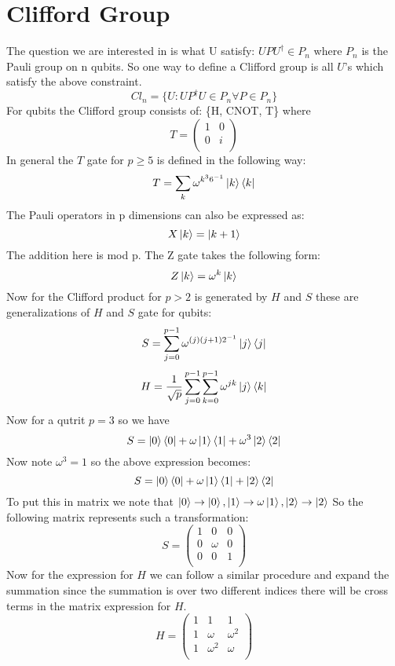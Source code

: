 \documentclass{article}
\begin{document}
\section{Clifford Group}
The question we are interested in is what U satisfy: $UPU^{\dagger} \in P_{n}$ where $P_{n}$ is the Pauli group on n qubits.
So one way to define a Clifford group is all $U$'s which satisfy the above constraint.
\begin{equation}
Cl_{n}=\{U: UP^{\dagger}U \in P_{n} \forall P \in P_{n}\}
\end{equation}
 For qubits the Clifford group consists of: \{H, CNOT, T\} where 
 \[
 T=
 \begin{pmatrix}
 1 & 0\\
 0 & i\\
 \end{pmatrix}
 \]
 In general the $T$ gate for $p \geq 5$ is defined in the following way:
 \[
 T=\sum_{k}\omega^{k^{3}6^{-1}}\ket{k}\bra{k}
 \]
The Pauli operators in p dimensions can also be expressed as:
\[
X\ket{k}=\ket{k+1}
\]
The addition here is mod p.
The Z gate takes the following form:
\[
Z\ket{k}=\omega^{k}\ket{k}
\]
Now for the Clifford product for $p>2$ is generated by $H$ and $S$ these are generalizations of $H$ and $S$ gate for qubits:
\[
S=\sum_{j=0}^{p-1}\omega^{(j)(j+1){2^{-1}}}\ket{j}\bra{j}
\]
\[
H=\frac{1}{\sqrt{p}}\sum_{j=0}^{p-1}\sum_{k=0}^{p-1}\omega^{jk}\ket{j}\bra{k}
\]
Now for a qutrit $p=3$ so we have 
\[
S=\ket{0}\bra{0}+\omega\ket{1}\bra{1}+\omega^{3}\ket{2}\bra{2}
\]
Now note $\omega^{3}=1$ so the above expression becomes:
\[
S=\ket{0}\bra{0}+\omega\ket{1}\bra{1}+\ket{2}\bra{2}
\]
To put this in matrix we note that $\ket{0} \to \ket{0}, \ket{1} \to \omega\ket{1}, \ket{2} \to \ket{2}$
So the following matrix represents such a transformation:
\[
S=
\begin{pmatrix}
1 & 0 & 0\\
0 & \omega & 0\\
0 & 0 & 1 \\
\end{pmatrix}
\]
Now for the expression for $H$ we can follow a similar procedure and expand the summation since the summation is over two different indices there will be cross terms in the matrix expression for $H$.
\[
H=
\begin{pmatrix}
1 & 1 & 1\\
1 & \omega & \omega^{2}\\
1 & \omega^{2} & \omega\\
\end{pmatrix}
\]
\end{document}
